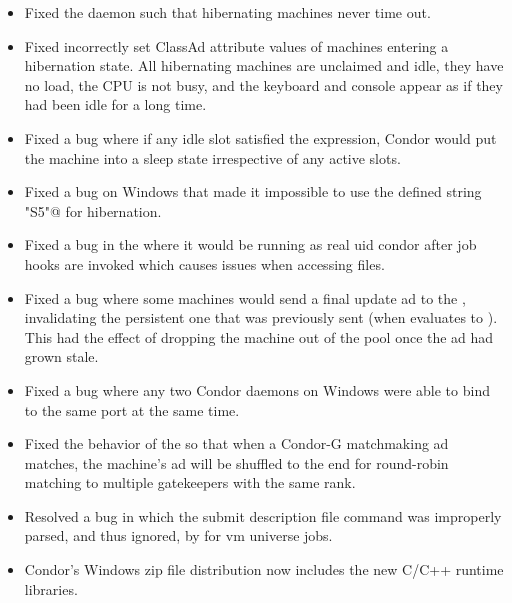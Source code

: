 \begin{itemize}

\item Fixed the  daemon such that hibernating machines
  never time out.

\item Fixed incorrectly set ClassAd attribute values of machines
  entering a hibernation state.
  All hibernating machines are unclaimed and idle,
  they have no load, the CPU is not busy, and
  the keyboard and console appear as if they had been idle for a long time.

\item Fixed a bug where if any idle slot satisfied the
   expression, Condor would put the machine into a
  sleep state irrespective of any active slots.

\item Fixed a bug on Windows that made it impossible to use
  the defined string \verb@"S5"@ for hibernation.

\item Fixed a bug in the  where it would be running as
  real uid condor after job hooks are invoked which causes issues when
  accessing files.

\item Fixed a bug where some machines would send a final update ad to
  the , invalidating the persistent one that was
  previously sent (when  evaluates to ).
  This had the effect of dropping the machine out of the pool once the
  ad had grown stale.

\item Fixed a bug where any two Condor daemons on Windows were able to
  bind to the same port at the same time.

\item Fixed the behavior of the  so that when a
  Condor-G matchmaking ad matches, the machine's ad will be shuffled
  to the end for round-robin matching to multiple gatekeepers with the
  same rank.

\item Resolved a bug in which the submit description file command
   was improperly parsed,
  and thus ignored, by  for vm universe jobs.

\item Condor's Windows zip file distribution now includes the new
  C/C++ runtime libraries.


\end{itemize}
